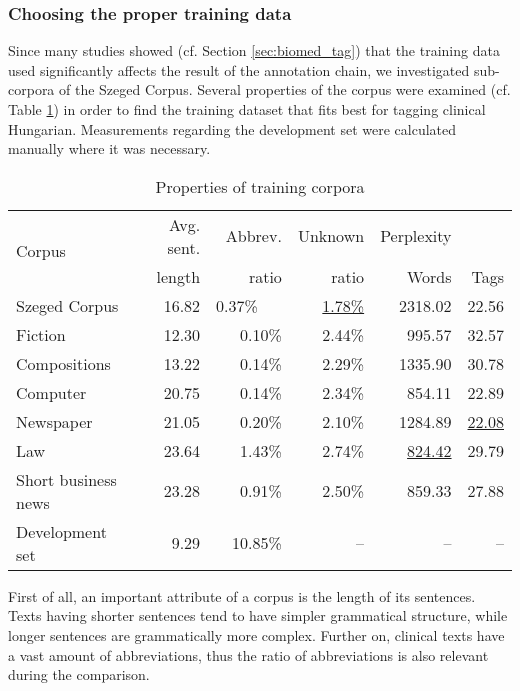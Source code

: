 \subsubsection{Choosing the proper training data}

Since many studies showed (cf. Section \ref{sec:biomed_tag}) that the training data used significantly affects the result of the annotation chain, we investigated sub-corpora of the Szeged Corpus. Several properties of the corpus were examined (cf. Table \ref{tab:subcorpora_attrib}) in order to find the training dataset that fits best for tagging clinical Hungarian. Measurements regarding the development set were calculated manually where it was necessary.

\begin{table}
\centering
\caption{Properties of training corpora}
\label{tab:subcorpora_attrib}
\begin{tabular}{ l r r r r r } 
\hline
\multicolumn{1}{l}{\multirow{2}{*}{Corpus}} & Avg. sent. & Abbrev.  &  Unknown & Perplexity \\
 & length & ratio &  ratio & Words & Tags \\
\hline
Szeged Corpus & 16.82 & 0.37\%\ \ \  & \underline{1.78\%} & \ \ 2318.02 & 22.56\\
\hspace{0.2cm} Fiction & 12.30 & 0.10\% & 2.44\% & 995.57 & 32.57\\
\hspace{0.2cm} Compositions & 13.22 & 0.14\% & 2.29\% & 1335.90 & 30.78\\
\hspace{0.2cm} Computer & 20.75 & 0.14\% & 2.34\% & 854.11 & 22.89\\
\hspace{0.2cm} Newspaper & 21.05 & 0.20\% & 2.10\% & 1284.89 & \underline{22.08}\\
\hspace{0.2cm} Law & 23.64 & 1.43\% & 2.74\% & \underline{824.42} & 29.79\\
\hspace{0.2cm} Short business news & 23.28 & 0.91\% & 2.50\% & 859.33 & 27.88\\
Development set & 9.29 & 10.85\% & -- & -- & -- \\
\hline
\end{tabular}
\end{table}

First of all, an important attribute of a corpus is the length of its sentences. Texts having shorter sentences tend to have simpler grammatical structure, while longer sentences are grammatically more complex. Further on, clinical texts have a vast amount of abbreviations, thus the ratio of abbreviations is also relevant during the comparison. 

